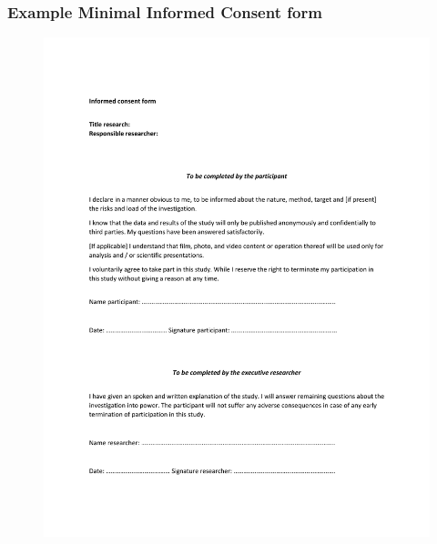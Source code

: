 \documentclass[xcolor=dvipsnames]{beamer}
\begin{document}
\begin{frame}
	\frametitle{Example Minimal Informed Consent form {\scriptsize\cite{informedconsentutwente}}}

	\begin{center}
	\vskip -1.4cm
	\begin{figure}
	\href{https://www.utwente.nl/en/bms/research/forms-and-downloads/example-informed-consent-form.pdf}
	{\includegraphics[height=1.1\textheight]{Pictures/example-informed-consent-form}}
	\end{figure}
	\end{center}

\end{frame}
\end{document}
